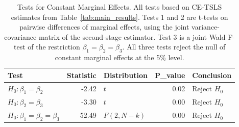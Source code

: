 \begin{table}[ht]
\centering
\caption{Tests for Constant Marginal Effects. All tests based on CE-TSLS estimates from Table~\ref{tab:main_results}. Tests 1 and 2 are t-tests on pairwise differences of marginal effects, using the joint variance-covariance matrix of the second-stage estimator. Test 3 is a joint Wald F-test of the restriction $\beta_1 = \beta_2 = \beta_3$. All three tests reject the null of constant marginal effects at the 5\% level.} 
\label{tab:tests}
\begin{tabular}{lrlrl}
  \toprule
Test & Statistic & Distribution & P_value & Conclusion \\ 
  \midrule
$H_0: \beta_1 = \beta_2$ & -2.42 & $t$ & 0.02 & Reject $H_0$ \\ 
  $H_0: \beta_2 = \beta_3$ & -3.30 & $t$ & 0.00 & Reject $H_0$ \\ 
  $H_0: \beta_1 = \beta_2 = \beta_3$ & 52.49 & $F(2, N-k)$ & 0.00 & Reject $H_0$ \\ 
   \bottomrule
\end{tabular}
\end{table}
